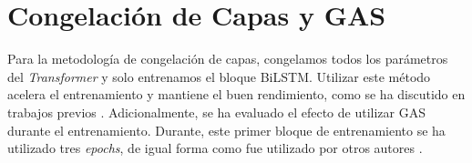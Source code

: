 \section{Congelación de Capas y GAS}

Para la metodología de congelación de capas, congelamos todos los parámetros del \textit{Transformer} y solo entrenamos el bloque BiLSTM. Utilizar este método acelera el entrenamiento y mantiene el buen rendimiento, como se ha discutido en trabajos previos \citep{merchant2020happens,lee2019would,kovaleva2019revealing}. Adicionalmente, se ha evaluado el efecto de utilizar GAS durante el entrenamiento. Durante, este primer bloque de entrenamiento se ha utilizado tres \textit{epochs}, de igual forma como fue utilizado por otros autores \citep{zhang2022hlab}.


